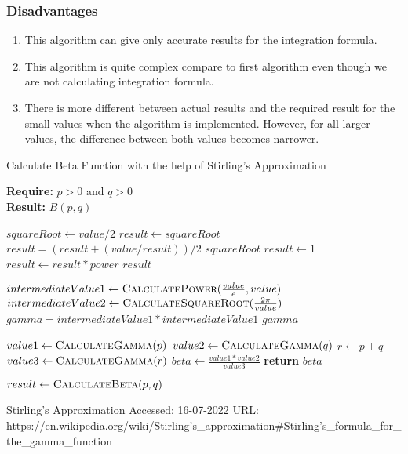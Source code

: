 \documentclass[12pt,report]{article}
\begin{document}
\subsubsection{Disadvantages}
\begin{enumerate}
    \item This algorithm can give only accurate results for the integration formula.
    \item This algorithm is quite complex compare to first algorithm even though we are not calculating integration formula.
    \item There is more different between actual results and the required result for the small values when the algorithm is implemented. However, for all larger values, the difference between both values becomes narrower.
\end{enumerate}

\begin{algorithm}[H]
\caption{Calculate Beta Function with the help of Stirling's Approximation}
\textbf{Require:} $p > 0$ and $q > 0$ \\
\textbf{Result:} $B(p,q)$
\begin{algorithmic}
    \State $squareRoot \leftarrow value / 2$
    \Repeat
        \State $result \leftarrow squareRoot$
        \State $result = (result +(value/result))/2$
    \State\Return $squareRoot$ 
    \EndProcedure
\Statex
{}
    \State $result \leftarrow 1$
    \State $result \leftarrow result * power$
    \EndFor
    \State\Return $result$ 
    \EndProcedure
\Statex

    \State $intermediateValue1 \leftarrow \Call{CalculatePower}{\frac{value}{e},value}$
    \State $intermediateValue2 \leftarrow \Call{CalculateSquareRoot}{\frac{2\pi}{value}}$
    \State $gamma = intermediateValue1 *intermediateValue1$
    \State\Return $gamma$
    \EndProcedure
\Statex

    \State $value1 \leftarrow \Call{CalculateGamma}{p}$
    \State $value2 \leftarrow \Call{CalculateGamma}{q}$
    \State $r \leftarrow p+q$
    \State $value3 \leftarrow \Call{CalculateGamma}{r}$
    \State $beta \leftarrow \frac{value1 * value2}{value3}$
    \State \textbf{return} $beta$
    \EndProcedure
\Statex

\State $result \leftarrow \Call{CalculateBeta}{p,q} $
\end{algorithmic}
\end{algorithm}

\begin{thebibliography}{plain}
\bibitem{}
Stirling's Approximation Accessed: 16-07-2022 URL: https://en.wikipedia.org/wiki/Stirling's\_approximation\#Stirling's\_formula\_for\_the\_gamma\_function
\end{thebibliography}
\end{document}

